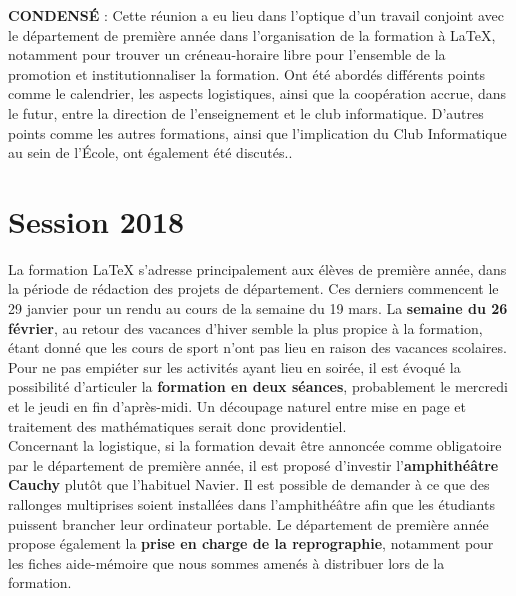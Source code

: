 \documentclass[12pt,twoside]{article}
\begin{document}
\begin{center}
\vspace{2cm}


\begin{minipage}{16cm}
  {\fontsize{11pt}{13pt}\selectfont
   \parindent=0pt
    {{\bf CONDENSÉ} : Cette réunion a eu lieu dans l'optique d'un travail conjoint avec le département de première année dans l'organisation de la formation à \LaTeX, notamment pour trouver un créneau-horaire libre pour l'ensemble de la promotion et institutionnaliser la formation. Ont été abordés différents points comme le calendrier, les aspects logistiques, ainsi que la coopération accrue, dans le futur, entre la direction de l'enseignement et le club informatique. D'autres points comme les autres formations, ainsi que l'implication du Club Informatique au sein de l'École, ont également été discutés.}.
\par}
\end{minipage}

\end{center}

\clearpage

\section*{Session 2018}

La formation \LaTeX\: s'adresse principalement aux élèves de première année, dans la période de rédaction des projets de département. Ces derniers commencent le 29 janvier pour un rendu au cours de la semaine du 19 mars. La {\bf semaine du 26 février}, au retour des vacances d'hiver semble la plus propice à la formation, étant donné que les cours de sport n'ont pas lieu en raison des vacances scolaires. Pour ne pas empiéter sur les activités ayant lieu en soirée, il est évoqué la possibilité d'articuler la {\bf formation en deux séances}, probablement le mercredi et le jeudi en fin d'après-midi. Un découpage naturel entre mise en page et traitement des mathématiques serait donc providentiel.\\

Concernant la logistique, si la formation devait être annoncée comme obligatoire par le département de première année, il est proposé d'investir l'{\bf amphithéâtre Cauchy} plutôt que l'habituel Navier. Il est possible de demander à ce que des rallonges multiprises soient installées dans l'amphithéâtre afin que les étudiants puissent brancher leur ordinateur portable. Le département de première année propose également la {\bf prise en charge de la reprographie}, notamment pour les fiches aide-mémoire que nous sommes amenés à distribuer lors de la formation.\\
\end{document}
